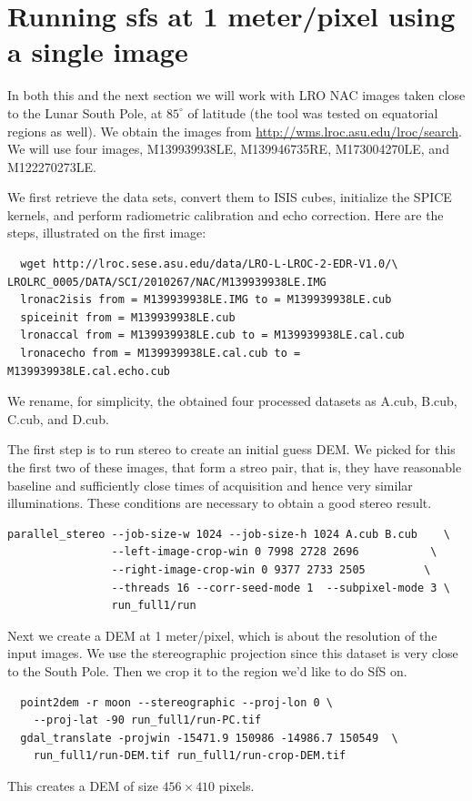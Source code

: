 \section{Running sfs at 1 meter/pixel using a single image}

In both this and the next section we will work with LRO NAC images taken
close to the Lunar South Pole, at $85^\circ$ of latitude (the tool was
tested on equatorial regions as well). We obtain the images from
\url{http://wms.lroc.asu.edu/lroc/search}.  We will use four images,
M139939938LE, M139946735RE, M173004270LE, and M122270273LE.

We first retrieve the data sets, convert them to ISIS cubes, initialize
the SPICE kernels, and perform radiometric calibration and echo
correction. Here are the steps, illustrated on the first image:
\begin{verbatim}
  wget http://lroc.sese.asu.edu/data/LRO-L-LROC-2-EDR-V1.0/\
LROLRC_0005/DATA/SCI/2010267/NAC/M139939938LE.IMG
  lronac2isis from = M139939938LE.IMG to = M139939938LE.cub
  spiceinit from = M139939938LE.cub
  lronaccal from = M139939938LE.cub to = M139939938LE.cal.cub
  lronacecho from = M139939938LE.cal.cub to = M139939938LE.cal.echo.cub
\end{verbatim}
We rename, for simplicity, the obtained four processed datasets as
A.cub, B.cub, C.cub, and D.cub.

The first step is to run stereo to create an initial guess DEM. We
picked for this the first two of these images, that form a streo pair,
that is, they have reasonable baseline and sufficiently close times of
acquisition and hence very similar illuminations. These conditions are
necessary to obtain a good stereo result.
\begin{verbatim}
parallel_stereo --job-size-w 1024 --job-size-h 1024 A.cub B.cub    \
                --left-image-crop-win 0 7998 2728 2696           \
                --right-image-crop-win 0 9377 2733 2505         \
                --threads 16 --corr-seed-mode 1  --subpixel-mode 3 \
                run_full1/run
\end{verbatim}
Next we create a DEM at 1 meter/pixel, which is about the resolution
of the input images. We use the stereographic projection since this
dataset is very close to the South Pole. Then we crop it to the region
we'd like to do SfS on.
\begin{verbatim}
  point2dem -r moon --stereographic --proj-lon 0 \
    --proj-lat -90 run_full1/run-PC.tif
  gdal_translate -projwin -15471.9 150986 -14986.7 150549  \
    run_full1/run-DEM.tif run_full1/run-crop-DEM.tif
\end{verbatim}
This creates a DEM of size $456 \times 410$ pixels.

